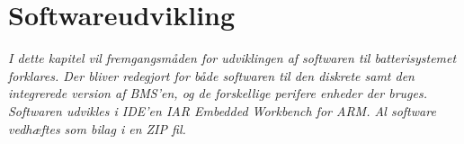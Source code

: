 \chapter{Softwareudvikling}\label{kap:softwareudvikling}

\emph{I dette kapitel vil fremgangsmåden for udviklingen af softwaren til batterisystemet forklares. Der bliver redegjort for både softwaren til den diskrete samt den integrerede version af BMS'en, og de forskellige perifere enheder der bruges. Softwaren udvikles i IDE'en IAR Embedded Workbench for ARM. Al software vedhæftes som bilag i en ZIP fil.}